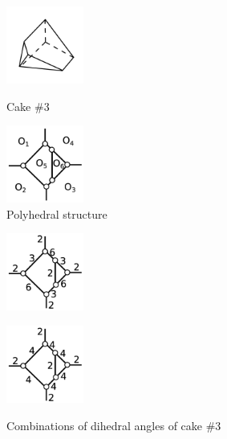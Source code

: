 \documentclass[suppldata, dvipdfmx]{interact}
\theoremstyle{plain}%
\theoremstyle{definition}
\theoremstyle{remark}
\theoremstyle{problemstyle}
\begin{document}
\begin{figure}[h!tbp]
  \begin{minipage}[t]{0.5\textwidth}
   \centering
   \includegraphics[width=1in,
   keepaspectratio]{./img/HexahedraWithSphericalFaces/hexahedralCake3/cake3.jpg}
   \caption{Cake \#3}
   \label{fig:cake3}
  \end{minipage}
 \hspace*{\fill}
  \begin{minipage}[t]{0.5\textwidth}
   \centering
   \includegraphics[width=1in, keepaspectratio]{./img/HexahedraWithSphericalFaces/hexahedralCake3/faces.jpg}
   \caption{Polyhedral structure}
   \label{fig:cake3polyhedralStructure}
  \end{minipage}
\end{figure}

\begin{figure}[h!tbp]
  \begin{minipage}[t]{0.5\textwidth}
   \centering
   \includegraphics[width=1in, keepaspectratio]{./img/HexahedraWithSphericalFaces/hexahedralCake3/a.jpg}
   \subcaption{}
   \label{fig:cake3a}
  \end{minipage}
 \hspace*{\fill}
  \begin{minipage}[t]{0.5\textwidth}
   \centering
   \includegraphics[width=1in, keepaspectratio]{./img/HexahedraWithSphericalFaces/hexahedralCake3/b.jpg}
   \subcaption{}
   \label{fig:cake3b}
  \end{minipage}
 \hspace*{\fill}
  \caption{Combinations of dihedral angles of cake \#3}
  \label{fig:cake3list}
\end{figure}
\end{document}

